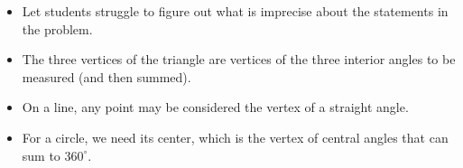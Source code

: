 \begin{teachingnote}
\begin{itemize}
\itemsep0em
\item Let students struggle to figure out what is imprecise about the statements in the problem.  
\item The three vertices of the triangle are vertices of the three interior angles to be measured (and then summed).  
\item On a line, any point may be considered the vertex of a straight angle.
\item For a circle, we need its center, which is the vertex of central angles 
that can sum to $360^\circ$.  
\end{itemize}
\end{teachingnote}






